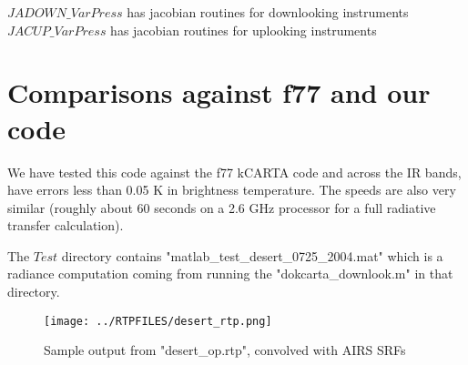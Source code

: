 \documentclass[12pt]{article}
\newcommand{\kc}{\textsf{kCARTA}\xspace}
\begin{document}
\noindent $JADOWN\_VarPress$ has jacobian routines for downlooking 
instruments\\

\noindent $JACUP\_VarPress$ has jacobian routines for uplooking instruments\\

\section{Comparisons against f77 and our code}
We have tested this code against the f77 \kc code and across the IR bands, 
have errors less than 0.05 K in brightness temperature. The speeds are also
very similar (roughly about 60 seconds on a 2.6 GHz processor for a full
radiative transfer calculation).

The $Test$ directory contains "matlab\_test\_desert\_0725\_2004.mat" which is 
a radiance computation coming from running the "dokcarta\_downlook.m" in that
directory.

\begin{figure}
\texttt{[image: ../RTPFILES/desert\_rtp.png]}
\caption{Sample output from "desert\_op.rtp", convolved with AIRS SRFs}
\label{translatingfiles}
\end{figure}
\end{document}
